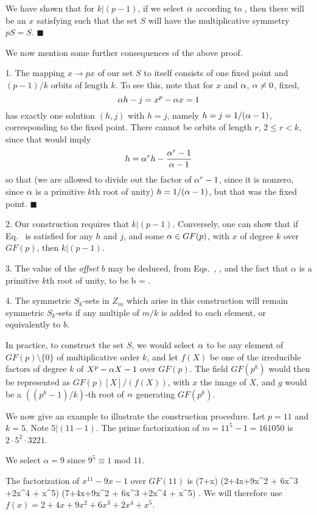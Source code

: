 We have shown that for $k|(p-1)$, if we select $\alpha$
according to , then there will be an $x$ satisfying
 such that the set $S$ will have
the multiplicative symmetry $pS=S$. \hfill $\blacksquare$

We now mention some further consequences of the above proof.

1. The mapping
$x \to px$ of our set $S$ to itself consists of one fixed point
and $(p-1)/k$ orbits of length $k$. To see this, note that for $x$ and $\alpha$,
$\alpha \ne 0$, fixed,
$$
   \alpha h - j =    x^p - \alpha x = 1
$$
has exactly one solution $(h,j)$ with $h = j$, namely $h = j = 1/(\alpha-1)$,
corresponding to the fixed point.
There cannot be orbits of length $r$, $2 \le r < k$, since
that would imply
$$h = \alpha^r h - \frac{\alpha^r - 1}{\alpha - 1}$$
so that (we are allowed to divide out the factor of $\alpha^r-1$, since
it
is nonzero, since $\alpha$ is a primitive $k$th root of unity)
$h = 1/(\alpha - 1)$, but that was the fixed point. \hfill $\blacksquare$

2. Our construction requires that $k | (p-1)$.
Conversely,
one can show that if Eq.~ is satisfied for any $h$ and $j$,
and some $\alpha \in GF(p)$, with $x$ of degree $k$ over $GF(p)$, then $k|(p-1)$.

3. The value of the {\em offset} $b$ may be deduced, from
Eqs.~, ,
and the fact that $\alpha$ is a primitive $k$th root of unity, to be
    b  =  .
\eeq

4. The symmetric $S_k$-sets in $Z_m$ which arise in this construction will
remain symmetric $S_k$-sets if any multiple of $m/k$ is added to each
element, or equivalently to $b$.

In practice, to construct the set $S$, we would select $\alpha$ to be any
element of $GF(p) \setminus \{0\}$ of
multiplicative order $k$, and let $f(X)$ be one of the irreducible
factors of degree $k$ of $X^p - \alpha X -1$ over $GF(p)$.
The field $GF(p^k)$ would then be represented as
$GF(p) [X] /(f(X))$, with $x$ the image of $X$,
and $g$ would be a $((p^k -1)/k)$-th root of $\alpha$ generating
$GF(p^k)$.

We now give an example to illustrate the construction procedure.
Let $p=11$ and $k=5$. Note $5 | (11-1)$.
The prime factorization of $m = 11^5-1 = 161050$
is $2 \cdot 5^2 \cdot 3221$. 

We select $\alpha=9$ since $9^5 \equiv 1$ mod $11$.

The factorization of $x^{11} - 9x - 1$   over $GF(11)$ is
  (7+x) (2+4x+9x^2 + 6x^3 +2x^4 + x^5) (7+4x+9x^2 + 6x^3 +2x^4 + x^5) .
\eeq
We will therefore use
$f(x) = 2+4x+9x^2 + 6x^3 +2x^4 + x^5$.

